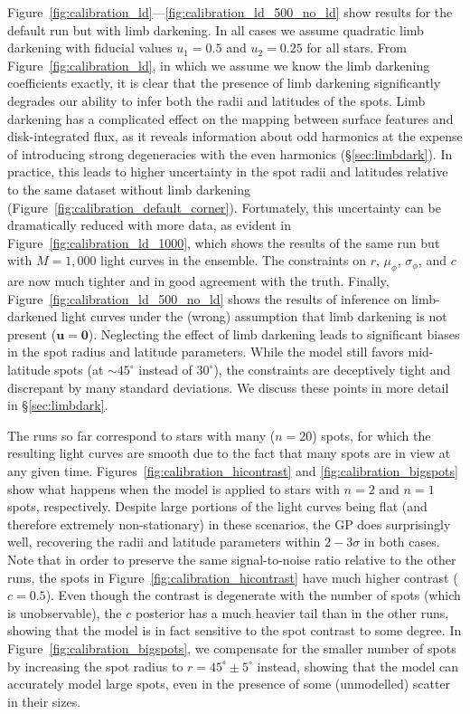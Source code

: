 \documentclass[modern]{aastex62}
\begin{document}
Figure~\ref{fig:calibration_ld}---\ref{fig:calibration_ld_500_no_ld}
show results for the default run but with limb darkening. In all cases
we assume quadratic limb darkening with fiducial values $u_1 = 0.5$
and $u_2 = 0.25$ for all stars. From Figure~\ref{fig:calibration_ld}, in which we
assume we know the limb darkening coefficients exactly, it is clear that
the presence of limb darkening significantly degrades our ability to
infer both the radii and latitudes of the spots. Limb darkening has a complicated
effect on the mapping between surface features and disk-integrated flux, as it
reveals information about odd harmonics at
the expense of introducing strong degeneracies with the even harmonics
(\S\ref{sec:limbdark}). In practice, this leads to higher uncertainty in
the spot radii and latitudes relative to the same dataset without limb
darkening (Figure~\ref{fig:calibration_default_corner}). Fortunately,
this uncertainty can be dramatically reduced with more data, as evident
in Figure~\ref{fig:calibration_ld_1000}, which shows the results of the
same run but with $M=1{,}000$ light curves in the ensemble. The constraints
on $r$, $\mu_\phi$, $\sigma_\phi$, and $c$ are now much tighter and in
good agreement with the truth. Finally, Figure~\ref{fig:calibration_ld_500_no_ld}
shows the results of inference on limb-darkened light curves under the
(wrong) assumption that limb darkening is not present ($\mathbf{u} = \mathbf{0}$).
Neglecting the effect of limb darkening leads to significant biases in the spot radius
and latitude parameters. While the model still favors mid-latitude spots
(at $\sim 45^\circ$ instead of $30^\circ$), the constraints are deceptively tight
and discrepant by many standard deviations. We discuss these points in
more detail in \S\ref{sec:limbdark}.

The runs so far correspond to stars with many ($n = 20$) spots, for which the
resulting light curves are smooth due to the fact that many spots are in
view at any given time. Figures~\ref{fig:calibration_hicontrast} and
\ref{fig:calibration_bigspots} show what happens when the model is applied to
stars with $n=2$ and $n=1$ spots, respectively. Despite large portions of the
light curves being flat (and therefore extremely non-stationary)
in these scenarios, the GP does surprisingly well, recovering the radii
and latitude parameters within $2-3\sigma$ in both cases.
Note that in order to preserve the same signal-to-noise ratio relative to
the other runs, the spots in Figure~\ref{fig:calibration_hicontrast}
have much higher contrast ($c = 0.5$). Even though the contrast is degenerate
with the number of spots (which is unobservable), the $c$ posterior
has a much heavier tail than in the other runs, showing that the model is
in fact sensitive to the spot contrast to some degree. In
Figure~\ref{fig:calibration_bigspots}, we compensate for the smaller number
of spots by increasing the spot radius to $r = 45^\circ \pm 5^\circ$ instead,
showing that the model can accurately model large spots, even in the
presence of some (unmodelled) scatter in their sizes.
\end{document}
